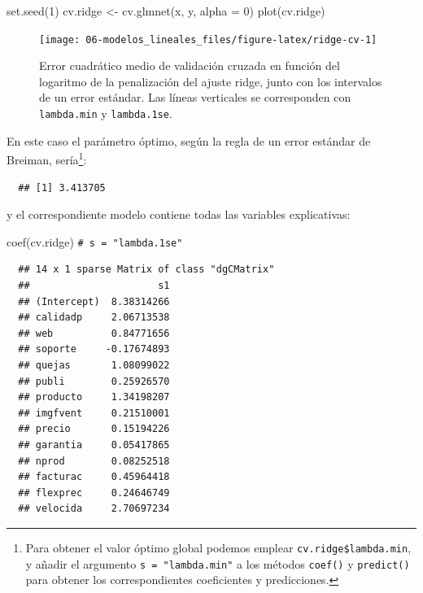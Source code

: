 \documentclass[
]{book}
\newenvironment{Shaded}{\begin{snugshade}}{\end{snugshade}}
\newcommand{\AttributeTok}[1]{\textcolor[rgb]{0.77,0.63,0.00}{#1}}
\newcommand{\CommentTok}[1]{\textcolor[rgb]{0.56,0.35,0.01}{\textit{#1}}}
\newcommand{\DecValTok}[1]{\textcolor[rgb]{0.00,0.00,0.81}{#1}}
\newcommand{\FloatTok}[1]{\textcolor[rgb]{0.00,0.00,0.81}{#1}}
\newcommand{\FunctionTok}[1]{\textcolor[rgb]{0.00,0.00,0.00}{#1}}
\newcommand{\NormalTok}[1]{#1}
\newcommand{\OtherTok}[1]{\textcolor[rgb]{0.56,0.35,0.01}{#1}}
\newcommand{\SpecialCharTok}[1]{\textcolor[rgb]{0.00,0.00,0.00}{#1}}
\theoremstyle{break}
\theoremstyle{nonumberplain}
\renewcommand{\CommentTok}[1]{\textcolor[rgb]{0.41,0.41,0.41}{\texttt{#1}}}
\begin{document}
\begin{Shaded}
\begin{Highlighting}[]
\FunctionTok{set.seed}\NormalTok{(}\DecValTok{1}\NormalTok{)}
\NormalTok{cv.ridge }\OtherTok{\textless{}{-}} \FunctionTok{cv.glmnet}\NormalTok{(x, y, }\AttributeTok{alpha =} \DecValTok{0}\NormalTok{)}
\FunctionTok{plot}\NormalTok{(cv.ridge)}
\end{Highlighting}
\end{Shaded}

\begin{figure}[!htb]

{\centering \texttt{[image: 06-modelos\_lineales\_files/figure-latex/ridge-cv-1]} 

}

\caption{Error cuadrático medio de validación cruzada en función del logaritmo de la penalización del ajuste ridge, junto con los intervalos de un error estándar. Las líneas verticales se corresponden con \texttt{lambda.min} y \texttt{lambda.1se}.}\label{fig:ridge-cv}
\end{figure}

En este caso el parámetro óptimo, según la regla de un error estándar de Breiman, sería\footnote{Para obtener el valor óptimo global podemos emplear \texttt{cv.ridge\$lambda.min}, y añadir el argumento \texttt{s\ =\ "lambda.min"} a los métodos \texttt{coef()} y \texttt{predict()} para obtener los correspondientes coeficientes y predicciones.}:

\begin{Shaded}
\end{Shaded}

\begin{verbatim}
  ## [1] 3.413705
\end{verbatim}

y el correspondiente modelo contiene todas las variables explicativas:

\begin{Shaded}
\begin{Highlighting}[]
\FunctionTok{coef}\NormalTok{(cv.ridge) }\CommentTok{\# s = "lambda.1se"}
\end{Highlighting}
\end{Shaded}

\begin{verbatim}
  ## 14 x 1 sparse Matrix of class "dgCMatrix"
  ##                      s1
  ## (Intercept)  8.38314266
  ## calidadp     2.06713538
  ## web          0.84771656
  ## soporte     -0.17674893
  ## quejas       1.08099022
  ## publi        0.25926570
  ## producto     1.34198207
  ## imgfvent     0.21510001
  ## precio       0.15194226
  ## garantia     0.05417865
  ## nprod        0.08252518
  ## facturac     0.45964418
  ## flexprec     0.24646749
  ## velocida     2.70697234
\end{verbatim}
\end{document}

